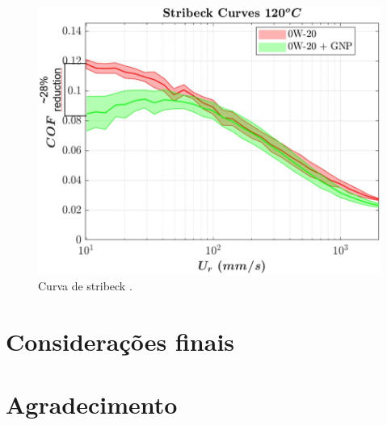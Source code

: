 \documentclass[isoft]{ufgtexposter}
\begin{document}
\begin{poster}
            \begin{figure}
                \centering
                \captionsetup{type=figure}
                \includegraphics[scale=1.3]{images/curva stribeck.jpg}
                \caption{Curva de stribeck \textit{}.}
                \label{fig:result}
            \end{figure}
    
            \lipsum[5]
            \cite{chollet2015keras}     
    
        \section{Considerações finais}
    
            \lipsum[15]
    
        \section{Agradecimento}
    
            \lipsum[57]
    
        
        
    
    
    \end{poster}
\end{document}
